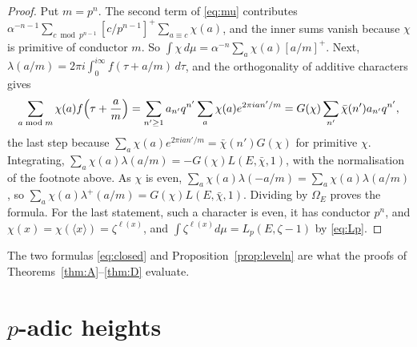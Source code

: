 \documentclass[11pt]{amsart}
\theoremstyle{definition}
\begin{document}
\begin{proof}
Put $m=p^n$. The second term of \eqref{eq:mu} contributes $\alpha^{-n-1}\sum_{c\bmod p^{n-1}}[c/p^{n-1}]^+\sum_{a\equiv c}\chi(a)$, and the inner sums vanish because $\chi$ is primitive of conductor $m$. So $\int\chi\,d\mu=\alpha^{-n}\sum_a\chi(a)[a/m]^+$. Next, $\lambda(a/m)=2\pi i\int_0^{i\infty}f(\tau+a/m)\,d\tau$, and the orthogonality of additive characters gives
\[
\sum_{a\bmod m}\chi(a)f\Bigl(\tau+\frac am\Bigr)=\sum_{n'\ge1}a_{n'}q^{n'}\sum_a\chi(a)e^{2\pi ian'/m}=G(\chi)\sum_{n'}\bar\chi(n')a_{n'}q^{n'},
\]
the last step because $\sum_a\chi(a)e^{2\pi ian'/m}=\bar\chi(n')G(\chi)$ for primitive $\chi$. Integrating, $\sum_a\chi(a)\lambda(a/m)=-G(\chi)L(E,\bar\chi,1)$, with the normalisation of the footnote above. As $\chi$ is even, $\sum_a\chi(a)\lambda(-a/m)=\sum_a\chi(a)\lambda(a/m)$, so $\sum_a\chi(a)\lambda^+(a/m)=G(\chi)L(E,\bar\chi,1)$. Dividing by $\Omega_E$ proves the formula. For the last statement, such a character is even, it has conductor $p^n$, and $\chi(x)=\chi(\langle x\rangle)=\zeta^{\ell(x)}$, and $\int\zeta^{\ell(x)}d\mu=L_p(E,\zeta-1)$ by \eqref{eq:Lp}.
\end{proof}

The two formulas \eqref{eq:closed} and Proposition~\ref{prop:leveln} are what the proofs of Theorems~\ref{thm:A}--\ref{thm:D} evaluate.

\section{\texorpdfstring{$p$}{p}-adic heights}\label{sec:heights}
\end{document}
